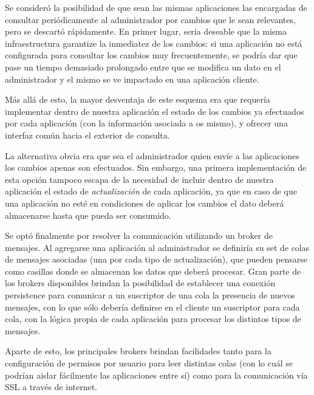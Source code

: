 Se consideró la posibilidad de que sean las mismas aplicaciones las encargadas de consultar periódicamente al
administrador por cambios que le sean relevantes, pero se descartó rápidamente. En primer lugar, sería deseable
que la misma infraestructura garantize la inmediatez de los cambios: si una aplicación no está configurada para
consultar los cambios muy frecuentemente, se podría dar que pase un tiempo demasiado prolongado entre que se
modifica un dato en el administrador y el mismo se ve impactado en una aplicación cliente.

Más allá de esto, la mayor desventaja de este esquema era que requería implementar dentro de nuestra aplicación
el estado de los cambios ya efectuados por cada aplicación (con la información asociada a os mismo), y ofrecer
una interfaz común hacia el exterior de consulta.

La alternativa obvia era que sea el administrador quien envíe a las aplicaciones los cambios apenas son efectuados.
Sin embargo, una primera implementación de esta opción tampoco escapa de la necesidad de incluir dentro de nuestra
aplicación el estado de \textit{actualización} de cada aplicación, ya que en caso de que una aplicación no esté
en condiciones de aplicar los cambios el dato deberá almacenarse hasta que pueda ser consumido.

%
%

Se optó finalmente por resolver la comunicación utilizando un broker de mensajes. Al agregarse una aplicación
al administrador se definiría su set de colas de mensajes asociadas (una por cada tipo de actualización), que
pueden pensarse como casillas donde  se almacenan los datos que deberá procesar. Gran parte de los brokers
disponibles brindan la posibilidad de establecer una conexión persistence para comunicar a un suscriptor de una
cola la presencia de nuevos mensajes, con lo que sólo debería definirse en el cliente un suscriptor para cada
cola, con la lógica propia de cada aplicación para procesar los distintos tipos de mensajes.

Aparte de esto, los principales brokers brindan facilidades tanto para la configuración de permisos por usuario
para leer distintas colas (con lo cuál se podrían aislar fácilmente las aplicaciones entre sí) como para la
comunicación vía SSL a través de internet.









